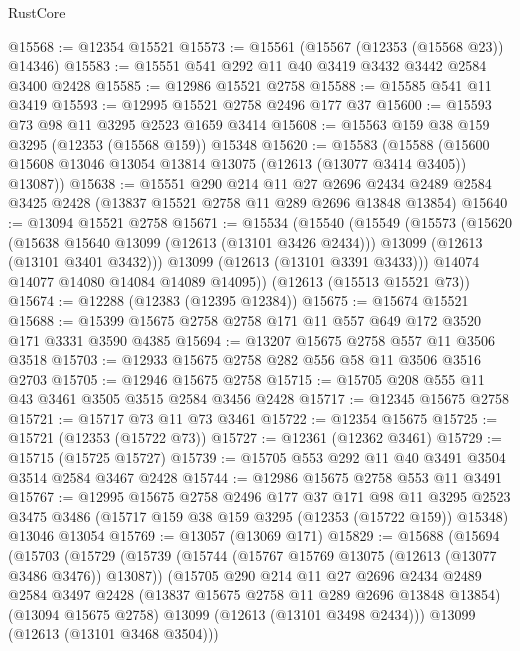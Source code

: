 \begin{lexlean}{RustCore}
\begin{coremodule}
@15568 := @12354 @15521
@15573 := @15561 (@15567 (@12353 (@15568 @23)) @14346)
@15583 := @15551 @541 @292 @11 @40 @3419 @3432 @3442 @2584 @3400 @2428
@15585 := @12986 @15521 @2758
@15588 := @15585 @541 @11 @3419
@15593 := @12995 @15521 @2758 @2496 @177 @37
@15600 := @15593 @73 @98 @11 @3295 @2523 @1659 @3414
@15608 := @15563 @159 @38 @159 @3295 (@12353 (@15568 @159)) @15348
@15620 := @15583
    (@15588 (@15600 @15608 @13046 @13054 @13814 @13075 (@12613 (@13077 @3414 @3405)) @13087))
@15638 := @15551
    @290
    @214
    @11
    @27
    @2696
    @2434
    @2489
    @2584
    @3425
    @2428
    (@13837 @15521 @2758 @11 @289 @2696 @13848 @13854)
@15640 := @13094 @15521 @2758
@15671 := @15534
    (@15540
      (@15549
        (@15573
          (@15620
            (@15638 @15640 @13099 (@12613 (@13101 @3426 @2434)))
            @13099
            (@12613 (@13101 @3401 @3432)))
          @13099
          (@12613 (@13101 @3391 @3433)))
        @14074
        @14077
        @14080
        @14084
        @14089
        @14095))
    (@12613 (@15513 @15521 @73))
@15674 := @12288 (@12383 (@12395 @12384))
@15675 := @15674 @15521
@15688 := @15399 @15675 @2758 @2758 @171 @11 @557 @649 @172 @3520 @171 @3331 @3590 @4385
@15694 := @13207 @15675 @2758 @557 @11 @3506 @3518
@15703 := @12933 @15675 @2758 @282 @556 @58 @11 @3506 @3516 @2703
@15705 := @12946 @15675 @2758
@15715 := @15705 @208 @555 @11 @43 @3461 @3505 @3515 @2584 @3456 @2428
@15717 := @12345 @15675 @2758
@15721 := @15717 @73 @11 @73 @3461
@15722 := @12354 @15675
@15725 := @15721 (@12353 (@15722 @73))
@15727 := @12361 (@12362 @3461)
@15729 := @15715 (@15725 @15727)
@15739 := @15705 @553 @292 @11 @40 @3491 @3504 @3514 @2584 @3467 @2428
@15744 := @12986 @15675 @2758 @553 @11 @3491
@15767 := @12995
    @15675
    @2758
    @2496
    @177
    @37
    @171
    @98
    @11
    @3295
    @2523
    @3475
    @3486
    (@15717 @159 @38 @159 @3295 (@12353 (@15722 @159)) @15348)
    @13046
    @13054
@15769 := @13057 (@13069 @171)
@15829 := @15688
    (@15694
      (@15703
        (@15729
          (@15739
            (@15744 (@15767 @15769 @13075 (@12613 (@13077 @3486 @3476)) @13087))
            (@15705
              @290
              @214
              @11
              @27
              @2696
              @2434
              @2489
              @2584
              @3497
              @2428
              (@13837 @15675 @2758 @11 @289 @2696 @13848 @13854)
              (@13094 @15675 @2758)
              @13099
              (@12613 (@13101 @3498 @2434)))
            @13099
            (@12613 (@13101 @3468 @3504)))

\end{coremodule}
\end{lexlean}
